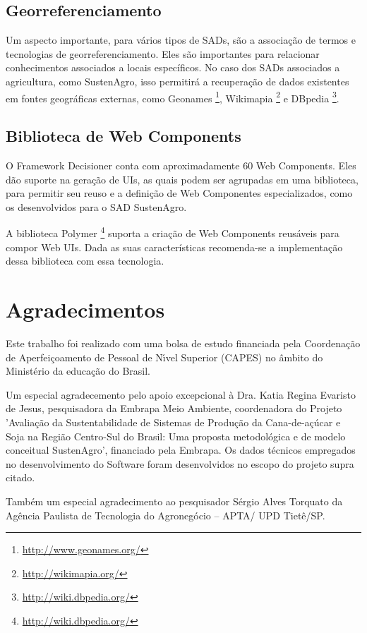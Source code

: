 \subsection*{Georreferenciamento}

Um aspecto importante, para vários tipos de SADs, são a associação
de termos e tecnologias de georreferenciamento. Eles são importantes
para relacionar conhecimentos associados a locais específicos. No
caso dos SADs associados a agricultura, como SustenAgro, isso permitirá
a recuperação de dados existentes em fontes geográficas externas,
como \foreignlanguage{english}{Geonames} \footnote{ \url{http://www.geonames.org/}},
\foreignlanguage{english}{Wikimapia} \footnote{ \url{http://wikimapia.org/}}
e \foreignlanguage{english}{DBpedia} \footnote{ \url{http://wiki.dbpedia.org/}}. 

\subsection*{Biblioteca de \foreignlanguage{english}{Web Components}}

O Framework Decisioner conta com aproximadamente 60 \foreignlanguage{english}{Web
Components}. Eles dão suporte na geração de UIs, as quais podem ser
agrupadas em uma biblioteca, para permitir seu reuso e a definição
de Web Componentes especializados, como os desenvolvidos para o SAD
SustenAgro.

A biblioteca \foreignlanguage{english}{Polymer} \footnote{ \url{http://wiki.dbpedia.org/}}
suporta a criação de \foreignlanguage{english}{Web Components} reusáveis
para compor Web UIs. Dada as suas características recomenda-se a implementação
dessa biblioteca com essa tecnologia. 

\section{Agradecimentos}

Este trabalho foi realizado com uma bolsa de estudo financiada pela
Coordenação de Aperfeiçoamento de Pessoal de N\'{ı}vel Superior (CAPES)
no âmbito do Ministério da educação do Brasil.

Um especial agradecemento pelo apoio excepcional à Dra. Katia Regina
Evaristo de Jesus, pesquisadora da Embrapa Meio Ambiente, coordenadora
do Projeto 'Avaliação da Sustentabilidade de Sistemas de Produção
da Cana-de-açúcar e Soja na Região Centro-Sul do Brasil: Uma proposta
metodológica e de modelo conceitual SustenAgro', financiado pela Embrapa.
Os dados técnicos empregados no desenvolvimento do Software foram
desenvolvidos no escopo do projeto supra citado. 

Também um especial agradecimento ao pesquisador Sérgio Alves Torquato
da Agência Paulista de Tecnologia do Agronegócio – APTA/ UPD Tietê/SP.
